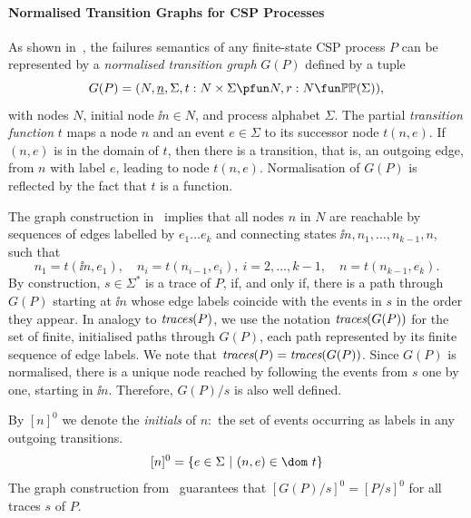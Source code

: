 \paragraph{Normalised Transition Graphs for CSP Processes} \label{sec:ntg}

As shown in~\cite{Roscoe:1994:chapter}, the failures semantics of any
finite-state CSP process $P$ can be represented by a \emph{normalised
transition graph} $G(P)$ defined by a tuple
$$
G(P) = ( N, \ii n, \Sigma, t : N\times\Sigma \pfun N, r : N \fun \mathbb{P}\mathbb{P}(\Sigma)),
$$
with nodes $N$, initial node $\ii n\in N$, and process alphabet $\Sigma$. The
partial \emph{transition function} $t$ maps a node $n$ and an event
$e\in\Sigma$ to its successor node $t(n,e)$. If $(n,e)$ is in the domain of
$t$, then there is a transition, that is, an outgoing edge, from $n$ with
label $e$, leading to node $t(n,e)$. Normalisation of $G(P)$ is reflected by
the fact that $t$ is a function.

The graph construction in~\cite{Roscoe:1994:chapter} implies that all nodes
$n$ in $N$ are reachable by sequences of edges labelled by $e_1\dots e_k$ and
connecting states $\ii n,n_1,\dots,n_{k-1},n$, such that
\[
n_1 = t(\ii n,e_1), \quad n_i = t(n_{i-1},e_i),\ i = 2,\dots,k-1,\quad
n= t(n_{k-1},e_k).
\]
%
By construction, $s\in\Sigma^*$ is a trace of $P$, if, and only if, there is
a path through $G(P)$ starting  at $\ii n$ whose edge labels coincide with
the events in $s$ in the order they appear. In analogy to $\text{\it traces}(P)$, we use
the notation $\text{\it traces}(G(P))$ for the set of finite, initialised paths through
$G(P)$, each path represented by its finite sequence of edge labels. We note
that $\text{\it traces}(P) = \text{\it traces}(G(P))$. Since $G(P)$ is normalised, there is a unique
node reached by following the events from $s$ one by one, starting in $\ii
n$. Therefore, $G(P)/s$  is also well defined.

By $[n]^0$ we denote the \emph{initials} of $n$:~the set of events occurring
as labels in any outgoing transitions.
$$
[n]^0 = \{ e\in\Sigma~|~(n,e)\in\dom~t \}
$$
The graph construction from~\cite{Roscoe:1994:chapter} guarantees that $[G(P)/s]^0 = [P/s]^0$ for all
traces $s$ of $P$.

